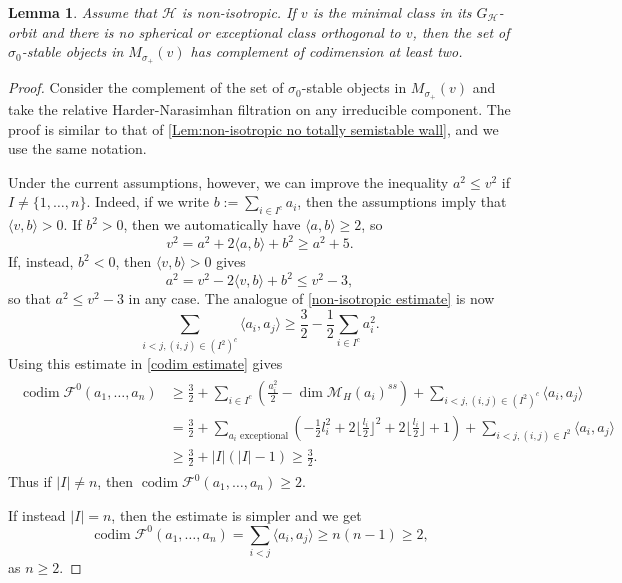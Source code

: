 \documentclass[leqno,11pt]{amsart}
\def\codim{\mathop{\mathrm{codim}}\nolimits}
\def\dim{\mathop{\mathrm{dim}}\nolimits}
\newtheorem{Lem}[Thm]{Lemma}
\theoremstyle{definition}
\def\FF{\ensuremath{\mathcal F}}
\def\HH{\ensuremath{\mathcal H}}
\def\MM{\ensuremath{\mathcal M}}
\begin{document}
\begin{Lem}
Assume that $\HH$ is non-isotropic.  If $v$ is the minimal class in its $G_{\HH}$-orbit and there is no spherical or exceptional class orthogonal to $v$, then the set of $\sigma_0$-stable objects in $M_{\sigma_+}(v)$ has complement of codimension at least two.
\end{Lem}
\begin{proof}
Consider the complement of the set of $\sigma_0$-stable objects in $M_{\sigma_+}(v)$ and take the relative Harder-Narasimhan filtration on any irreducible component.  The proof is similar to that of \ref{Lem:non-isotropic no totally semistable wall}, and we use the same notation.  

Under the current assumptions, however, we can improve the inequality $a^2\leq v^2$ if $I\neq\{1,\ldots,n\}$.  Indeed, if we write $b:=\sum_{i\in I^c}a_i$, then the assumptions imply that $\langle v,b\rangle>0$.  If $b^2>0$, then we automatically have $\langle a,b\rangle\geq 2$, so $$v^2=a^2+2\langle a,b\rangle+b^2\geq a^2+5.$$  If, instead, $b^2<0$, then $\langle v,b\rangle>0$ gives $$a^2=v^2-2\langle v,b\rangle+b^2\leq v^2-3,$$ so that $a^2\leq v^2-3$ in any case.  The analogue of \eqref{non-isotropic estimate} is now 
\begin{equation}
\sum_{i<j,(i,j)\in(I^2)^c}\langle a_i,a_j\rangle\geq\frac{3}{2}-\frac{1}{2}\sum_{i\in I^c}a_i^2.
\end{equation}
Using this estimate in \eqref{codim estimate} gives 
\begin{align}
\begin{split}
\codim\FF^0(a_1,\ldots,a_n)&\geq\frac{3}{2}+\sum_{i\in I^c}(\frac{a_i^2}{2}-\dim\MM_H(a_i)^{ss})+\sum_{i<j,(i,j)\in (I^2)^c}\langle a_i,a_j\rangle\\
&=\frac{3}{2}+\sum_{a_i\mbox{ exceptional}}(-\frac{1}{2}l_i^2+2\lfloor\frac{l_i}{2}\rfloor^2+2\lfloor\frac{l_i}{2}\rfloor+1)+\sum_{i<j,(i,j)\in I^2}\langle a_i,a_j\rangle\\
&\geq\frac{3}{2}+|I|(|I|-1)\geq\frac{3}{2}.
\end{split}
\end{align}
Thus if $|I|\neq n$, then $\codim\FF^0(a_1,\ldots,a_n)\geq 2$.  

If instead $|I|=n$, then the estimate is simpler and we get 
\begin{equation}
\codim\FF^0(a_1,\ldots,a_n)=\sum_{i<j}\langle a_i,a_j\rangle\geq n(n-1)\geq 2,
\end{equation}
as $n\geq 2$.  
\end{proof}
\end{document}
